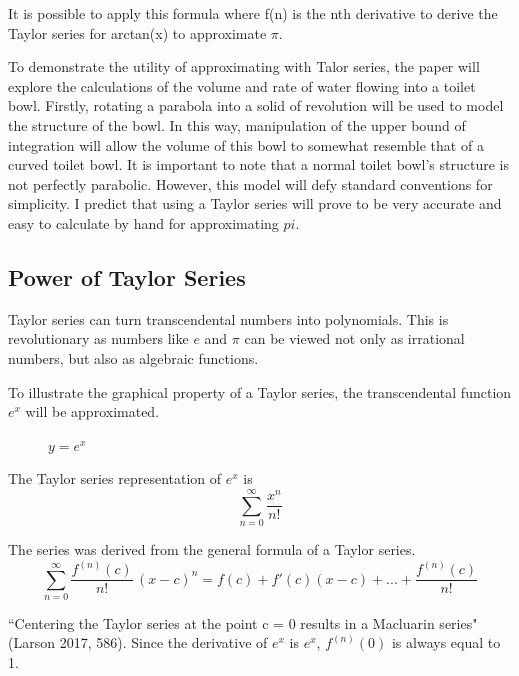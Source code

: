 \documentclass[12pt, titlepage]{article}
\begin{document}
It is possible to apply this formula where f(n) is the nth derivative to derive the Taylor series for arctan(x) to approximate \(\pi\).

To demonstrate the utility of approximating with Talor series, the paper will explore the calculations of the volume and rate of water flowing into a toilet bowl. Firstly, rotating a parabola into a solid of revolution will be used to model the structure of the bowl. In this way, manipulation of the upper bound of integration will allow the volume of this bowl to somewhat resemble that of a curved toilet bowl. It is important to note that a normal toilet bowl's structure is not perfectly parabolic. However, this model will defy standard conventions for simplicity. I predict that using a Taylor series will prove to be very accurate and easy to calculate by hand for approximating \(pi\). 

\subsection{Power of Taylor Series}
Taylor series can turn transcendental numbers into polynomials. This is revolutionary as numbers like \(e\) and \(\pi\) can be viewed not only as irrational numbers, but also as algebraic functions.

To illustrate the graphical property of a Taylor series, the transcendental function \(e^{x}\) will be approximated.
\begin{figure}[H]
\centering
    \caption[]{\(y=e^x\)}
\end{figure}

The Taylor series representation of \(e^{x}\) is  
\begin{equation*}
  \sum_{n=0}^{\infty} \frac{x^{n}}{n!}
\end{equation*}

The series was derived from the general formula of a Taylor series.
\begin{equation*}
  \sum_{n=0}^{\infty} \frac{f^{(n)}(c)}{n!} \, (x-c)^{n} = f(c) + f'(c)(x-c) + ... +  \frac{f^{(n)}(c)}{n!}
\end{equation*}

``Centering the Taylor series at the point c = 0 results in a Macluarin series" (Larson 2017, 586). Since the derivative of \(e^{x}\) is \(e^{x}\), \(f^{(n)}(0)\) is always equal to 1.
\end{document}

